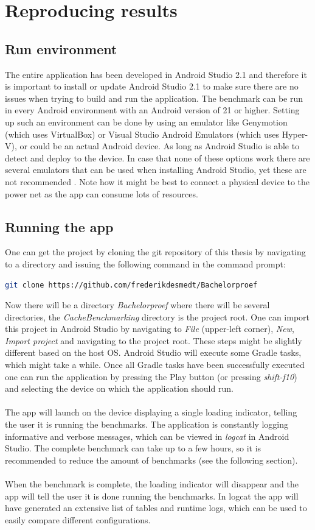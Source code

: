 \documentclass[pdftex,a4paper,12pt,twoside]{report}
\begin{document}
\section{Reproducing results}
\subsection{Run environment}
The entire application has been developed in Android Studio 2.1 and therefore it is important to install or update Android Studio 2.1 to make sure there are no issues when trying to build and run the application.
The benchmark can be run in every Android environment with an Android version of 21 or higher. Setting up such an environment can be done by using an emulator like Genymotion (which uses VirtualBox) or Visual Studio Android Emulators (which uses Hyper-V), or could be an actual Android device. As long as Android Studio is able to detect and deploy to the device. In case that none of these options work there are several emulators that can be used when installing Android Studio, yet these are not recommended \citep{android_studio_embedded_emulators}. Note how it might be best to connect a physical device to the power net as the app can consume lots of resources.
\subsection{Running the app}
One can get the project by cloning the git repository of this thesis by navigating to a directory and issuing the following command in the command prompt:
\begin{lstlisting}[language=sh]
git clone https://github.com/frederikdesmedt/Bachelorproef
\end{lstlisting}
Now there will be a directory \emph{Bachelorproef} where there will be several directories, the \emph{CacheBenchmarking} directory is the project root. One can import this project in Android Studio by navigating to \emph{File} (upper-left corner), \emph{New}, \emph{Import project} and navigating to the project root. These steps might be slightly different based on the host OS. Android Studio will execute some Gradle tasks, which might take a while. Once all Gradle tasks have been successfully executed one can run the application by pressing the Play button (or pressing \emph{shift-f10}) and selecting the device on which the application should run.
\\\\
The app will launch on the device displaying a single loading indicator, telling the user it is running the benchmarks. The application is constantly logging informative and verbose messages, which can be viewed in \emph{logcat} in Android Studio.
The complete benchmark can take up to a few hours, so it is recommended to reduce the amount of benchmarks (see the following section).
\\\\
When the benchmark is complete, the loading indicator will disappear and the app will tell the user it is done running the benchmarks. In logcat the app will have generated an extensive list of tables and runtime logs, which can be used to easily compare different configurations.
\end{document}
